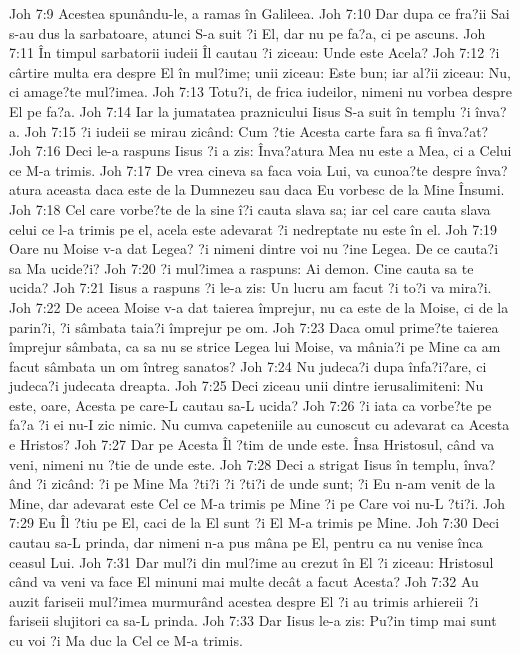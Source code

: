 Joh 7:9  Acestea spunându-le, a ramas în Galileea.
Joh 7:10  Dar dupa ce fra?ii Sai s-au dus la sarbatoare, atunci S-a suit ?i El, dar nu pe fa?a, ci pe ascuns.
Joh 7:11  În timpul sarbatorii iudeii Îl cautau ?i ziceau: Unde este Acela?
Joh 7:12  ?i cârtire multa era despre El în mul?ime; unii ziceau: Este bun; iar al?ii ziceau: Nu, ci amage?te mul?imea.
Joh 7:13  Totu?i, de frica iudeilor, nimeni nu vorbea despre El pe fa?a.
Joh 7:14  Iar la jumatatea praznicului Iisus S-a suit în templu ?i înva?a.
Joh 7:15  ?i iudeii se mirau zicând: Cum ?tie Acesta carte fara sa fi înva?at?
Joh 7:16  Deci le-a raspuns Iisus ?i a zis: Înva?atura Mea nu este a Mea, ci a Celui ce M-a trimis.
Joh 7:17  De vrea cineva sa faca voia Lui, va cunoa?te despre înva?atura aceasta daca este de la Dumnezeu sau daca Eu vorbesc de la Mine Însumi.
Joh 7:18  Cel care vorbe?te de la sine î?i cauta slava sa; iar cel care cauta slava celui ce l-a trimis pe el, acela este adevarat ?i nedreptate nu este în el.
Joh 7:19  Oare nu Moise v-a dat Legea? ?i nimeni dintre voi nu ?ine Legea. De ce cauta?i sa Ma ucide?i?
Joh 7:20  ?i mul?imea a raspuns: Ai demon. Cine cauta sa te ucida?
Joh 7:21  Iisus a raspuns ?i le-a zis: Un lucru am facut ?i to?i va mira?i.
Joh 7:22  De aceea Moise v-a dat taierea împrejur, nu ca este de la Moise, ci de la parin?i, ?i sâmbata taia?i împrejur pe om.
Joh 7:23  Daca omul prime?te taierea împrejur sâmbata, ca sa nu se strice Legea lui Moise, va mânia?i pe Mine ca am facut sâmbata un om întreg sanatos?
Joh 7:24  Nu judeca?i dupa înfa?i?are, ci judeca?i judecata dreapta.
Joh 7:25  Deci ziceau unii dintre ierusalimiteni: Nu este, oare, Acesta pe care-L cautau sa-L ucida?
Joh 7:26  ?i iata ca vorbe?te pe fa?a ?i ei nu-I zic nimic. Nu cumva capeteniile au cunoscut cu adevarat ca Acesta e Hristos?
Joh 7:27  Dar pe Acesta Îl ?tim de unde este. Însa Hristosul, când va veni, nimeni nu ?tie de unde este.
Joh 7:28  Deci a strigat Iisus în templu, înva?ând ?i zicând: ?i pe Mine Ma ?ti?i ?i ?ti?i de unde sunt; ?i Eu n-am venit de la Mine, dar adevarat este Cel ce M-a trimis pe Mine ?i pe Care voi nu-L ?ti?i.
Joh 7:29  Eu Îl ?tiu pe El, caci de la El sunt ?i El M-a trimis pe Mine.
Joh 7:30  Deci cautau sa-L prinda, dar nimeni n-a pus mâna pe El, pentru ca nu venise înca ceasul Lui.
Joh 7:31  Dar mul?i din mul?ime au crezut în El ?i ziceau: Hristosul când va veni va face El minuni mai multe decât a facut Acesta?
Joh 7:32  Au auzit fariseii mul?imea murmurând acestea despre El ?i au trimis arhiereii ?i fariseii slujitori ca sa-L prinda.
Joh 7:33  Dar Iisus le-a zis: Pu?in timp mai sunt cu voi ?i Ma duc la Cel ce M-a trimis.
